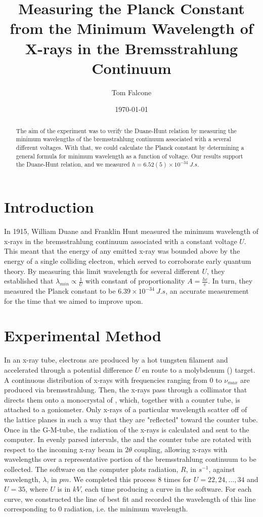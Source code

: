 \documentclass[aps,prl,preprint,groupedaddress]{revtex4-2}
\begin{document}
\title{Measuring the Planck Constant from the Minimum Wavelength of X-rays in the Bremsstrahlung Continuum}
\author{Tom Falcone}
\date{\today}
\begin{abstract}
    The aim of the experiment was to verify the Duane-Hunt relation by measuring the minimum wavelengths of the bremsstrahlung continuum associated with a several different voltages. With that, we could calculate the Planck constant by determining a general formula for minimum wavelength as a function of voltage. Our results support the Duane-Hunt relation, and we measured $h = 6.52(5) \times 10^{-34} ~\si{J.s}$.
\end{abstract}
\maketitle
\section{Introduction}
    In 1915, William Duane and Franklin Hunt measured the minimum wavelength of x-rays in the bremsstrahlung continuum associated with a constant voltage $U$.~\cite{duane} This meant that the energy of any emitted x-ray was bounded above by the energy of a single colliding electron, which served to corroborate early quantum theory. By measuring this limit wavelength for several different $U$, they established that $\lambda_{min} \propto \frac{1}{U}$ with constant of proportionality $A = \frac{h c}{e}$. In turn, they measured the Planck constant to be $6.39 \times 10^{-34}~\si{J.s}$, an accurate measurement for the time that we aimed to improve upon.
\section{Experimental Method}
    In an x-ray tube, electrons are produced by a hot tungsten filament and accelerated through a potential difference $U$ en route to a molybdenum () target. A continuous distribution of x-rays with frequencies ranging from $0$ to $\nu_{max}$
    are produced via bremsstrahlung. Then, the x-rays pass through a collimator that directs them onto a monocrystal of , which, together with a counter tube, is attached to a goniometer. Only x-rays of a particular wavelength scatter off of the  lattice planes in such a way that they are "reflected" toward the counter tube. Once in the G-M-tube, the radiation of the x-rays is calculated and sent to the computer. In evenly parsed intervals, the  and the counter tube are rotated with respect to the incoming x-ray beam in $2\theta$ coupling, allowing x-rays with wavelengths over a representative portion of the bremsstrahlung continuum to be collected. The software on the computer plots radiation, $R$, in $\si{s^{-1}}$, against wavelength,  $\lambda$, in $\si{pm}$. We completed this process $8$ times for $U = 22, 24, \ldots, 34$ and $U = 35$, where $U$ is in $\si{kV}$, each time producing a curve in the software. For each curve, we constructed the line of best fit and recorded the wavelength of this line corresponding to $0$ radiation, i.e. the minimum wavelength.
\end{document}
